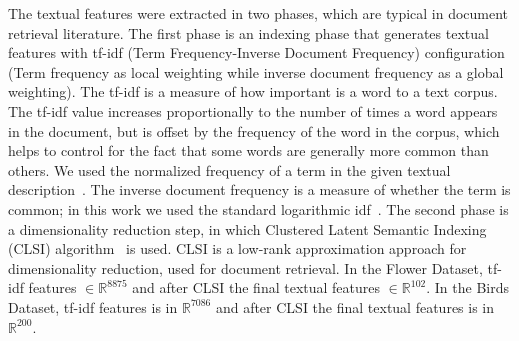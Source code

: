 The textual features were extracted in two phases, which are typical in document retrieval literature. The first phase is an indexing phase that generates textual features with tf-idf (Term Frequency-Inverse Document Frequency) configuration (Term frequency as local weighting while inverse document frequency as a global weighting). The tf-idf is a measure of how important is a word to a text corpus. The tf-idf value increases proportionally to the number of times a word appears in the document, but is offset by the frequency of the word in the corpus, which helps to control for the fact that some words are generally more common than others. We used the normalized frequency of a term in the given textual description~\cite{salton1988term}. The inverse document frequency is a measure of whether the term is common; in this work we used the standard logarithmic idf~\cite{salton1988term}.   
The second phase is a dimensionality reduction step, in which  Clustered Latent Semantic Indexing (CLSI) algorithm~\cite{clsi05} is used. CLSI is a low-rank approximation approach for dimensionality reduction, used for document retrieval. In the Flower Dataset, tf-idf features $\in \mathbb{R}^{8875}$ and after CLSI the final textual features $\in \mathbb{R}^{102}$. In the Birds Dataset, tf-idf features is in $\mathbb{R}^{7086}$ and after CLSI the final textual features is in $\mathbb{R}^{200}$. 

\begin{comment}
\begin{table}
\scalebox(0.8){
\begin{tabular}{| c | c | c | c |}
\hline
\small
& \begin{minipage}[t]{0.22\columnwidth}%
tf-idf Features dimensions 
\end{minipage}  & \begin{minipage}[t]{0.17\columnwidth}CLSI Cluster count \end{minipage} & \begin{minipage}[t]{0.21\columnwidth}Reduced Dimensions \end{minipage}\\
\hline
\begin{minipage}[c]{0.17\columnwidth}Birds Dataset \end{minipage}&7086 & 200 & 200 \\
\hline 
\begin{minipage}[c]{0.17\columnwidth}Flower Dataset \end{minipage}&8875 & 102 & 102 \\
\hline
\end{tabular}}
\caption{Textual features specifications}
\label{clsiTextFsTable}
\end{table}

\end{comment}

